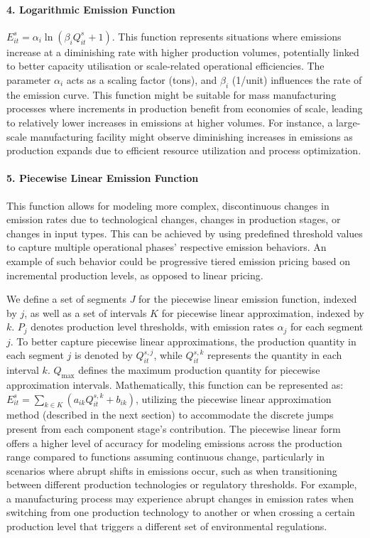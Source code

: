 \documentclass[final,3p,times,review,authoryear]{elsarticle}
\begin{document}
\paragraph{4. Logarithmic Emission Function}
$E_{it}^s = \alpha_i \ln(\beta_i Q_{it}^s + 1)$. This function represents situations where emissions increase at a diminishing rate with higher production volumes, potentially linked to better capacity utilisation or scale-related operational efficiencies. The parameter $\alpha_i$ acts as a scaling factor (tons), and $\beta_i$ (1/unit) influences the rate of the emission curve. This function might be suitable for mass manufacturing processes where increments in production benefit from economies of scale, leading to relatively lower increases in emissions at higher volumes. For instance, a large-scale manufacturing facility might observe diminishing increases in emissions as production expands due to efficient resource utilization and process optimization.

\paragraph{5. Piecewise Linear Emission Function}
This function allows for modeling more complex, discontinuous changes in emission rates due to technological changes, changes in production stages, or changes in input types. This can be achieved by using predefined threshold values to capture multiple operational phases' respective emission behaviors. An example of such behavior could be progressive tiered emission pricing based on incremental production levels, as opposed to linear pricing. 

We define a set of segments \( J \) for the piecewise linear emission function, indexed by \( j \), as well as a set of intervals \( K \) for piecewise linear approximation, indexed by \( k \). \( P_j \) denotes production level thresholds, with emission rates \( \alpha_j \) for each segment \( j \). To better capture piecewise linear approximations, the production quantity in each segment \( j \) is denoted by \( Q_{it}^{s,j} \), while \( Q_{it}^{s,k} \) represents the quantity in each interval \( k \). \( Q_{\text{max}} \) defines the maximum production quantity for piecewise approximation intervals. Mathematically, this function can be represented as:
$E_{it}^s = \sum_{k \in K} (a_{ik} Q_{it}^{s,k} + b_{ik})$, utilizing the piecewise linear approximation method (described in the next section) to accommodate the discrete jumps present from each component stage's contribution. The piecewise linear form offers a higher level of accuracy for modeling emissions across the production range compared to functions assuming continuous change, particularly in scenarios where abrupt shifts in emissions occur, such as when transitioning between different production technologies or regulatory thresholds. For example, a manufacturing process may experience abrupt changes in emission rates when switching from one production technology to another or when crossing a certain production level that triggers a different set of environmental regulations.
\end{document}
